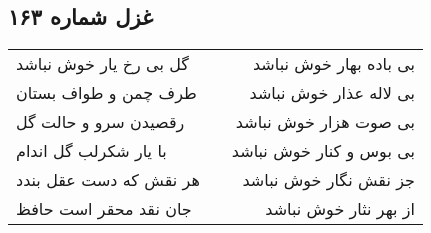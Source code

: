 \begin{center}
\section*{غزل شماره ۱۶۳}
\label{sec:sh163}
\begin{longtable}{l p{0.5cm} r}
گل بی رخ یار خوش نباشد
&&
بی باده بهار خوش نباشد
\\
طرف چمن و طواف بستان
&&
بی لاله عذار خوش نباشد
\\
رقصیدن سرو و حالت گل
&&
بی صوت هزار خوش نباشد
\\
با یار شکرلب گل اندام
&&
بی بوس و کنار خوش نباشد
\\
هر نقش که دست عقل بندد
&&
جز نقش نگار خوش نباشد
\\
جان نقد محقر است حافظ
&&
از بهر نثار خوش نباشد
\\
\end{longtable}
\end{center}

